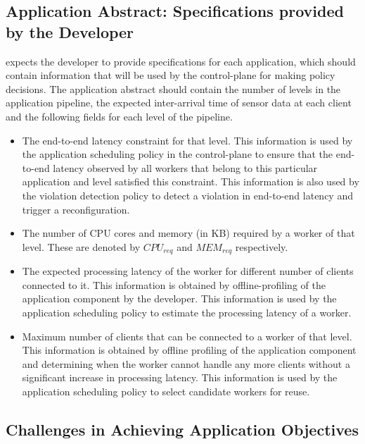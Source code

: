 \subsection{Application Abstract: Specifications provided by the Developer}
\oneedge{} expects the developer to provide specifications for each application, which should contain information that will be used by the control-plane for making policy decisions. The application abstract should contain the number of levels in the application pipeline, the expected inter-arrival time of sensor data at each client and the following fields for each level of the pipeline.
\begin{itemize}
\item The end-to-end latency constraint for that level. This information is used by the application scheduling policy in the control-plane to ensure that the end-to-end latency observed by all workers that belong to this particular application and level satisfied this constraint. This information is also used by the violation detection policy to detect a violation in end-to-end latency and trigger a reconfiguration.
\item The number of CPU cores and memory (in KB) required by a worker of that level. These are denoted by $CPU_{req}$ and $MEM_{req}$ respectively.
\item The expected processing latency of the worker for different number of clients connected to it. This information is obtained by offline-profiling of the application component by the developer. This information is used by the application scheduling policy to estimate the processing latency of a worker.
\item Maximum number of clients that can be connected to a worker of that level. This information is obtained by offline profiling of the application component and determining when the worker cannot handle any more clients without a significant increase in processing latency. This information is used by the application scheduling policy to select candidate workers for reuse.
\end{itemize}

\subsection{Challenges in Achieving Application Objectives}

